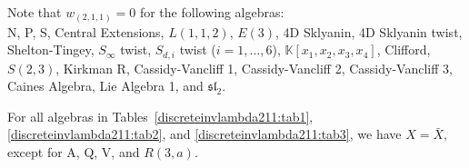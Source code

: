 \documentclass{amsart}
\begin{document}

\FloatBarrier

\begin{remark}
Note that \(w_{(2,1,1)} = 0\) for the following algebras: \\
N, P, S, Central Extensions, $L(1,1,2)$, $E(3)$, 4D Sklyanin, 4D Sklyanin twist, Shelton-Tingey, $S_\infty$ twist, $S_{d,i}$ twist ($i=1,\ldots,6$), $\mathbb{K}[x_1,x_2,x_3,x_4]$,  Clifford, $S(2,3)$, Kirkman R, Cassidy-Vancliff 1, Cassidy-Vancliff 2, Cassidy-Vancliff 3, Caines Algebra, Lie Algebra 1, and \(\mathfrak{sl}_2\).
\end{remark}

\begin{remark}
For all algebras in Tables~\ref{discreteinvlambda211:tab1}, \ref{discreteinvlambda211:tab2}, and \ref{discreteinvlambda211:tab3}, we have $X = \bar{X},$ except for A, Q, V, and $R(3,a)$.
\end{remark}
\end{document}
